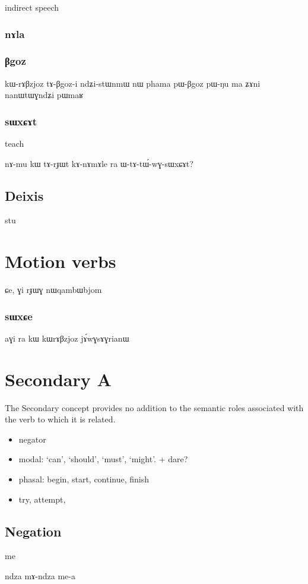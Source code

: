 \documentclass[oldfontcommands,oneside,a4paper,11pt]{article}
\begin{document}
  indirect speech
 \subsubsection{nɤla}
 
\subsubsection{βgoz}
kɯ-rɤβzjoz tɤ-βgoz-i
 ndʑi-stɯnmɯ nɯ phama pɯ-βgoz pɯ-ŋu ma ʑɤni nanɯtɯɣndʑi pɯmaʁ
 
\subsubsection{sɯxɕɤt} 
teach

 nɤ-mu kɯ tɤ-rɟɯt kɤ-nɤmɤle ra   ɯ-tɤ-tɯ́-wɣ-sɯxɕɤt?
\subsection{Deixis}
 stu
 
 \section{Motion verbs}
 
 \citealt{jacques13harmonization}
 ɕe, ɣi rɟɯɣ nɯqambɯbjom
 \subsubsection{sɯxɕe}
 aɣi ra kɯ kɯrɤβzjoz jɤ́wɣsɤɣrianɯ
 \section{Secondary A} 
  The Secondary concept provides no addition to the semantic roles associated with the verb to which it is related.
   \begin{itemize}
\item negator
\item modal: ‘can’, ‘should’, ‘must’, ‘might’. + dare?
\item phasal: begin, start, continue, finish
\item try, attempt,  
\end{itemize}

  \subsection{Negation}
  me
  
  ndza mɤ-ndza me-a
  
\end{document}
